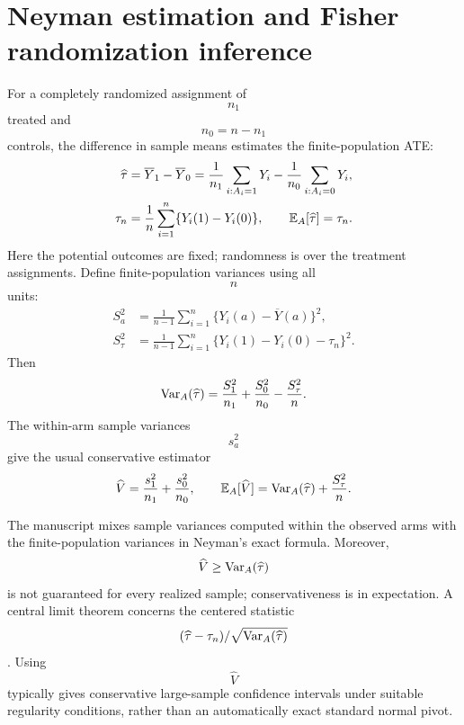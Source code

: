 \section{Neyman estimation and Fisher randomization inference}
For a completely randomized assignment of $$n_1$$ treated and $$n_0=n-n_1$$ controls, the difference in sample means estimates the finite-population ATE:
\begin{align}
\widehat\tau&=\overline Y_1-\overline Y_0
=\frac1{n_1}\sum_{i:A_i=1}Y_i-\frac1{n_0}\sum_{i:A_i=0}Y_i,\\
\tau_n&=\frac1n\sum_{i=1}^n\{Y_i(1)-Y_i(0)\},\qquad
\mathbb E_A[\widehat\tau]=\tau_n.
\end{align}
Here the potential outcomes are fixed; randomness is over the treatment assignments. Define finite-population variances using all $$n$$ units:
\begin{align}
S_a^2&=\frac1{n-1}\sum_{i=1}^n\{Y_i(a)-\overline Y(a)\}^2,\\
S_\tau^2&=\frac1{n-1}\sum_{i=1}^n\{Y_i(1)-Y_i(0)-\tau_n\}^2.
\end{align}
Then
\begin{equation}
\operatorname{Var}_A(\widehat\tau)=\frac{S_1^2}{n_1}+\frac{S_0^2}{n_0}-\frac{S_\tau^2}{n}.
\end{equation}
The within-arm sample variances $$s_a^2$$ give the usual conservative estimator
\begin{equation}
\widehat V=\frac{s_1^2}{n_1}+\frac{s_0^2}{n_0},\qquad
\mathbb E_A[\widehat V]=\operatorname{Var}_A(\widehat\tau)+\frac{S_\tau^2}{n}.
\end{equation}
\begin{correction}
The manuscript mixes sample variances computed within the observed arms with the finite-population variances in Neyman's exact formula. Moreover, $$\widehat V\geq\operatorname{Var}_A(\widehat\tau)$$ is not guaranteed for every realized sample; conservativeness is in expectation. A central limit theorem concerns the centered statistic $$(\widehat\tau-\tau_n)/\sqrt{\operatorname{Var}_A(\widehat\tau)}$$. Using $$\widehat V$$ typically gives conservative large-sample confidence intervals under suitable regularity conditions, rather than an automatically exact standard normal pivot.
\end{correction}


